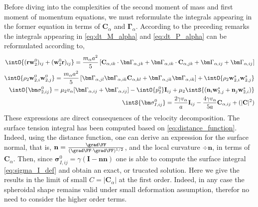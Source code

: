 Before diving into the complexities of the second moment of mass and first moment of momentum equations, we must reformulate the integrals appearing in the former equation in terms of $\textbf{C}_\alpha$ and $\bm\Gamma_\alpha$.  
According to the preceding remarks the integrals appearing in \ref{eq:dt_M_alpha} and \ref{eq:dt_P_alpha} can be reformulated according to, 
\begin{align}
    \intO{(\textbf{rw}_2^0 )_{ij}+ (\textbf{w}_2^0 \textbf{r})_{ij}} 
    =\frac{m_\alpha a^2}{5}\left[
        \textbf{C}_{\alpha,ik} \cdot \bm\Gamma_{\alpha,jk}
        +  \bm\Gamma_{\alpha,ik} \cdot \textbf{C}_{\alpha,jk}
        +  \bm\Gamma_{\alpha,ij} + \bm\Gamma_{\alpha,ij}
    \right] 
    \\
    \intO{\rho_2 \textbf{w}_{2,i}^0\textbf{w}_{2,j}^0}
    =\frac{m_\alpha a^2}{5} \left[
        \bm\Gamma_{\alpha,jl}\bm\Gamma_{\alpha,ik} \textbf{C}_{\alpha,kl} 
            + \bm\Gamma_{\alpha,jk}\bm\Gamma_{\alpha,ik} 
    \right]  
        +\intO{\rho_2 \textbf{w}_{2,i}^s\textbf{w}_{2,j}^s}
    \\
    \label{eq:sigma_2_def}
    \intO{\bm\sigma_{2,ij}^0}
    =
    \mu_2 v_\alpha [\bm\Gamma_{\alpha,ij} + \bm\Gamma_{\alpha,ij}]
    - \intO{p_2^0} \textbf{I}_{ij}
    + \mu_2 \intS{(\textbf{n}_i \textbf{w}_{2,j}^s + \textbf{n}_j \textbf{w}_{2,i}^s)}
    \\
    \label{eq:sigma_I_def}
    \intS{\bm\sigma_{I,ij}^0}
    = \frac{2 \gamma v_\alpha }{a} \textbf{I}_{ij} - \frac{4 \gamma v_\alpha }{5 a} \textbf{C}_{\alpha,ij}
    +\mathcal(|\textbf{C}|^2)
\end{align}
These expressions are direct consequences of the velocity decomposition.
The surface tension integral has been computed based on \ref{eq:distance_function}.
Indeed, using the distance function, one can derive an expression for the surface normal, that is, $\textbf{n} = \frac{\grad \FF}{(\grad \FF\cdot\grad \FF)^{1/2}}$, and the local curvature $\div \textbf{n}$, in terms of $\textbf{C}_\alpha$\citep{nadim1996concise}.
Then, since $\bm\sigma_{I,ij}^0 = \gamma (\textbf{I}- \textbf{nn})$ one is able to compute the surface integral \ref{eq:sigma_I_def} and obtain an exact, or trucated solution. 
Here we give the results in the limit of small $C = |\textbf{C}_\alpha|$ at the first order. 
Indeed, in any case the spheroidal shape remains valid under small deformation assumption, therefor no need to consider the higher order terms. 


